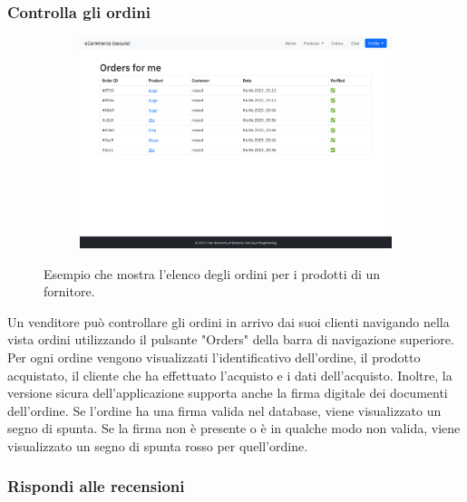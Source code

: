 \documentclass[conference,onecolumn,a4paper]{IEEEtran}
\begin{document}
\subsubsection{Controlla gli ordini}

\begin{figure}[H]
    \centering
    \begin{subfigure}[b]{0.4\linewidth}
        \includegraphics[width=\linewidth]{resources/orders.png}
    \end{subfigure}
    \caption{Esempio che mostra l'elenco degli ordini per i prodotti di un fornitore.}
\end{figure}

Un venditore può controllare gli ordini in arrivo dai suoi clienti navigando nella vista ordini utilizzando il pulsante "Orders" della barra di navigazione superiore. Per ogni ordine vengono visualizzati l'identificativo dell'ordine, il prodotto acquistato, il cliente che ha effettuato l'acquisto e i dati dell'acquisto. Inoltre, la versione sicura dell'applicazione supporta anche la firma digitale dei documenti dell'ordine. Se l'ordine ha una firma valida nel database, viene visualizzato un segno di spunta. Se la firma non è presente o è in qualche modo non valida, viene visualizzato un segno di spunta rosso per quell'ordine.

\subsubsection{Rispondi alle recensioni}
\end{document}
